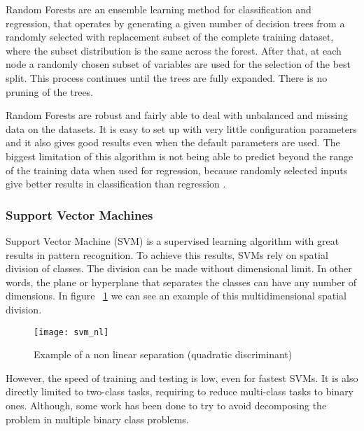 Random Forests \cite{raey} are an ensemble learning method for classification
and regression, that operates by generating a given number of decision trees
from a randomly selected with replacement subset of the complete training
dataset, where the subset distribution is the same across the forest. After
that, at each node a randomly chosen subset of variables are used for the
selection of the best split. This process continues until the trees are fully
expanded. There is no pruning of the trees.

Random Forests are robust and fairly able to deal with unbalanced and missing
data on the datasets. It is easy to set up with very little configuration
parameters and it also gives good results even when the default parameters are
used. The biggest limitation of this algorithm is not being able to predict
beyond the range of the training data when used for regression, because randomly
selected inputs give better results in classification than regression
\cite{raey}.

\subsubsection{Support Vector Machines}

Support Vector Machine (SVM) is a supervised learning algorithm with great
results in pattern recognition. \cite{Cortes95support-vectornetworks} To achieve
this results, SVMs rely on spatial division of classes. The division can be made
without dimensional limit. In other words, the plane or hyperplane that
separates the classes can have any number of dimensions. In figure
~\ref{fig:svm_nonlin} we can see an example of this multidimensional spatial
division.

\begin{figure}[h] \begin{center} \leavevmode
\texttt{[image: svm\_nl]} \caption{Example of a non linear
separation (quadratic discriminant)\cite{Bennett03supportvector}}
\label{fig:svm_nonlin} \end{center} \end{figure}

However, the speed of training and testing is low, even for fastest SVMs. It is
also directly limited to two-class tasks\cite{Cortes95support-vectornetworks},
requiring to reduce multi-class tasks to binary ones. Although, some work has
been done to try to avoid decomposing the problem in multiple binary class
problems.\cite{Crammer:2002:AIM:944790.944813}

